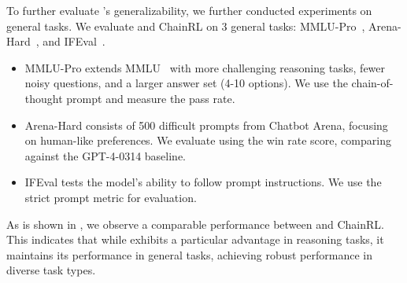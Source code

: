 To further evaluate \model's generalizability, we further conducted experiments on general tasks.
We evaluate \model and ChainRL on $3$ general tasks: MMLU-Pro~\citep{wang2024mmlu}, Arena-Hard~\citep{li2024crowdsourced}, and IFEval~\citep{zhou2023instruction}.

\begin{itemize}
    \item MMLU-Pro extends MMLU~\citep{hendrycks2020measuring} with more challenging reasoning tasks, fewer noisy questions, and a larger answer set (4-10 options). We use the chain-of-thought prompt and measure the pass rate.
    \item Arena-Hard consists of 500 difficult prompts from Chatbot Arena, focusing on human-like preferences. We evaluate using the win rate score, comparing against the GPT-4-0314 baseline.
    \item IFEval tests the model's ability to follow prompt instructions. We use the strict prompt metric for evaluation.
\end{itemize}

\begin{table}[ht]
    \centering
    \caption{Performance on general benchmarks.}
    \label{tab:general-task-performance}
\end{table}


As is shown in , we observe a comparable performance between \model and ChainRL. This indicates that while \model exhibits a particular advantage in reasoning tasks, it maintains its performance in general tasks, achieving robust performance in diverse task types.

